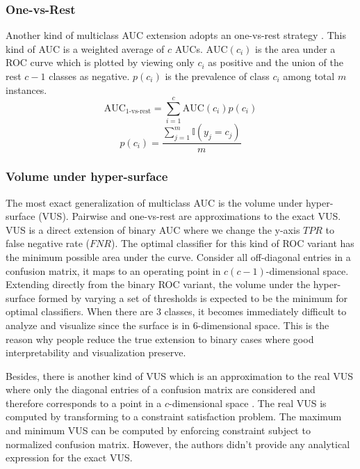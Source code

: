 \documentclass[twoside,11pt]{article}
\renewcommand{\>}{{\rightarrow}}
\newcommand{\1}{{\mathbf 1}}
\newcommand{\0}{{\mathbf 0}}
\begin{document}
\subsubsection{One-vs-Rest}\label{sec:1-vs-rest}
Another kind of multiclass AUC extension adopts an one-vs-rest strategy \cite{Provost2003}. This kind of AUC is a weighted average of $c$ AUCs. $\text{AUC}(c_i)$ is the area under a ROC curve which is plotted by viewing only $c_i$ as positive and the union of the rest $c-1$ classes as negative. $p(c_i)$ is the prevalence of class $c_i$ among total $m$ instances.
\begin{equation}\label{eq:1-vs-rest}
    \text{AUC}_{\text{1-vs-rest}} = \sum\limits_{i=1}^c \text{AUC}(c_i) p(c_i)
\end{equation}
\begin{equation}
    p(c_i) = \frac{\sum\limits_{j=1}^m\mathbb{I}(y_j=c_j)}{m}
\end{equation}

\subsubsection{Volume under hyper-surface}
The most exact generalization of multiclass AUC is the volume under hyper-surface (VUS). Pairwise and one-vs-rest are approximations to the exact VUS. 
VUS is a direct extension of binary AUC where we change the y-axis $TPR$ to false negative rate ($FNR$). The optimal classifier for this kind of ROC variant has the minimum possible area under the curve. Consider all off-diagonal entries in a confusion matrix, it maps to an operating point in $c(c-1)$-dimensional space. Extending directly from the binary ROC variant, the volume under the hyper-surface formed by varying a set of thresholds is expected to be the minimum for optimal classifiers. When there are 3 classes, it becomes immediately difficult to analyze and visualize since the surface is in 6-dimensional space. This is the reason why people reduce the true extension to binary cases where good interpretability and visualization preserve. 

Besides, there is another kind of VUS which is an approximation to the real VUS where only the diagonal entries of a confusion matrix are considered and therefore corresponds to a point in a $c$-dimensional space \cite{VUS-2}. The real VUS is computed by transforming to a constraint satisfaction problem. The maximum and minimum VUS can be computed by enforcing constraint subject to normalized confusion matrix. However, the authors didn't provide any analytical expression for the exact VUS.
\end{document}
